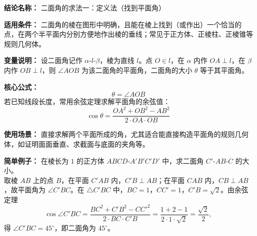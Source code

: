 \textbf{结论名称：} 二面角的求法一：定义法（找到平面角）

\textbf{适用条件：} 二面角的棱在图形中明确，且能在棱上找到（或作出）一个恰当的点，在两个半平面内分别方便地作出棱的垂线；常见于正方体、正棱柱、正棱锥等规则几何体。

\textbf{变量说明：} 设二面角记作 $\alpha\text{-}l\text{-}\beta$，棱为直线 $l$。点 $O\in l$，在 $\alpha$ 内作 $OA\perp l$，在 $\beta$ 内作 $OB\perp l$，则 $\angle AOB$ 为该二面角的平面角，二面角的大小 $\theta$ 等于其平面角。

\textbf{核心公式：}
\[
\boxed{\theta = \angle AOB}
\]
若已知线段长度，常用余弦定理求解平面角的余弦值：
\[
\boxed{\cos\theta = \frac{OA^{2} + OB^{2} - AB^{2}}{2\cdot OA \cdot OB}}
\]

\textbf{使用场景：} 直接求解两个平面所成的角，尤其适合能直接构造平面角的规则几何体，如证明面面垂直、求截面与底面的夹角等。

\textbf{简单例子：} 在棱长为 $1$ 的正方体 $ABCD\text{-}A'B'C'D'$ 中，求二面角 $C'\text{-}AB\text{-}C$ 的大小。\\
取棱 $AB$ 上的点 $B$，在平面 $C'AB$ 内，$C'B\perp AB$；在平面 $CAB$ 内，$CB\perp AB$，故平面角为 $\angle C'BC$。在 $\triangle C'BC$ 中，$BC=1$，$CC'=1$，$C'B=\sqrt{2}$。由余弦定理
\[
\cos\angle C'BC = \frac{BC^{2}+C'B^{2}-CC'^{2}}{2\cdot BC\cdot C'B}
= \frac{1+2-1}{2\cdot 1\cdot\sqrt{2}} = \frac{\sqrt{2}}{2},
\]
得 $\angle C'BC = 45^{\circ}$，即二面角为 $45^{\circ}$。